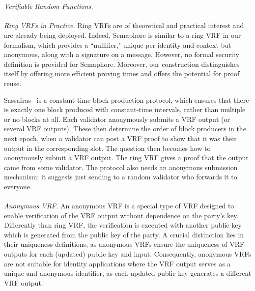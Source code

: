 \\\\
\noindent\textit{Verifiable Random Functions.} 
\\\\
\noindent\textit{Ring VRFs in Practice.} 
Ring VRFs are of theoretical and practical interest and are already being deployed.
Indeed, Semaphore \cite{Semaphore} is similar to a ring VRF in our formalism, which provides a ``nullifier," unique per identity and context but anonymous, along with a signature on a message. However, no formal security definition is provided for Semaphore.  Moreover, our construction distinguishes itself by offering more efficient proving times  and offers the potential for proof reuse.

Sassafras~\cite{Sassafras} is a constant-time block production protocol, which ensures that there is exactly one block produced with constant-time intervals, rather than multiple or no blocks at all.
Each validator anonymously submits a VRF output (or several VRF outputs). These then determine the order of block producers in the next epoch, when a validator can post a VRF proof to show that it was their output in the corresponding slot. The question then becomes how to anonymously submit a VRF output. The ring VRF gives a proof that the output came from some validator. The protocol also needs an anonymous submission mechanism: it suggests just sending to a random validator who forwards it to everyone.
\\\\
\noindent\textit{Anonymous VRF.}  An anonymous VRF \cite{anonymousVRF} is a special type of VRF designed to enable verification of the VRF output without dependence on the party's key.  Differently than ring VRF, the verification is executed with another public key which is generated from the public key of the party.  A crucial distinction lies in their  uniqueness definitions, as anonymous VRFs ensure the uniqueness of VRF outputs for each (updated) public key and input. Consequently, anonymous VRFs are not suitable for identity applications where the VRF output serves as a unique and anonymous identifier, as each updated public key generates a different VRF output.

